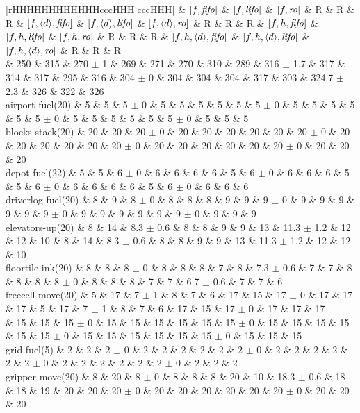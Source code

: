\begin{center}
\begin{tabular}{|rHHHHHHHHHHHHcccHHH|cccHHH|}
 & $[f,{\text{\textit{fifo}}}]$ & $[f,{\text{\textit{lifo}}}]$ & $[f,{\text{\textit{ro}}}]$ & R & R & R & $[f,{\left<d\right>},{\text{\textit{fifo}}}]$ & $[f,{\left<d\right>},{\text{\textit{lifo}}}]$ & $[f,{\left<d\right>},{\text{\textit{ro}}}]$ & R & R & R & $[f,h,{\text{\textit{fifo}}}]$ & $[f,h,{\text{\textit{lifo}}}]$ & $[f,h,{\text{\textit{ro}}}]$ & R & R & R & $[f,h,{\left<d\right>},{\text{\textit{fifo}}}]$ & $[f,h,{\left<d\right>},{\text{\textit{lifo}}}]$ & $[f,h,{\left<d\right>},{\text{\textit{ro}}}]$ & R & R & R\\
\hline
 & 250 & 315 & 270 $\pm$ 1 & 269 & 271 & 270 & 310 & 289 & 316 $\pm$ 1.7 & 317 & 314 & 317 & 295 & 316 & 304 $\pm$ 0 & 304 & 304 & 304 & 317 & 303 & 324.7 $\pm$ 2.3 & 326 & 322 & 326\\
\hline
airport-fuel(20) & 5 & 5 & 5 $\pm$ 0 & 5 & 5 & 5 & 5 & 5 & 5 $\pm$ 0 & 5 & 5 & 5 & 5 & 5 & 5 $\pm$ 0 & 5 & 5 & 5 & 5 & 5 & 5 $\pm$ 0 & 5 & 5 & 5\\
blocks-stack(20) & 20 & 20 & 20 $\pm$ 0 & 20 & 20 & 20 & 20 & 20 & 20 $\pm$ 0 & 20 & 20 & 20 & 20 & 20 & 20 $\pm$ 0 & 20 & 20 & 20 & 20 & 20 & 20 $\pm$ 0 & 20 & 20 & 20\\
depot-fuel(22) & 5 & 5 & 6 $\pm$ 0 & 6 & 6 & 6 & 6 & 5 & 6 $\pm$ 0 & 6 & 6 & 6 & 5 & 5 & 6 $\pm$ 0 & 6 & 6 & 6 & 6 & 5 & 6 $\pm$ 0 & 6 & 6 & 6\\
driverlog-fuel(20) & 8 & 9 & 8 $\pm$ 0 & 8 & 8 & 8 & 9 & 9 & 9 $\pm$ 0 & 9 & 9 & 9 & 9 & 9 & 9 $\pm$ 0 & 9 & 9 & 9 & 9 & 9 & 9 $\pm$ 0 & 9 & 9 & 9\\
elevators-up(20) & 8 & 14 & 8.3 $\pm$ 0.6 & 8 & 8 & 9 & 9 & 13 & 11.3 $\pm$ 1.2 & 12 & 12 & 10 & 8 & 14 & 8.3 $\pm$ 0.6 & 8 & 8 & 9 & 9 & 13 & 11.3 $\pm$ 1.2 & 12 & 12 & 10\\
floortile-ink(20) & 8 & 8 & 8 $\pm$ 0 & 8 & 8 & 8 & 7 & 8 & 7.3 $\pm$ 0.6 & 7 & 7 & 8 & 8 & 8 & 8 $\pm$ 0 & 8 & 8 & 8 & 7 & 7 & 6.7 $\pm$ 0.6 & 7 & 7 & 6\\
freecell-move(20) & 5 & 17 & 7 $\pm$ 1 & 8 & 7 & 6 & 17 & 15 & 17 $\pm$ 0 & 17 & 17 & 17 & 5 & 17 & 7 $\pm$ 1 & 8 & 7 & 6 & 17 & 15 & 17 $\pm$ 0 & 17 & 17 & 17\\
 & 15 & 15 & 15 $\pm$ 0 & 15 & 15 & 15 & 15 & 15 & 15 $\pm$ 0 & 15 & 15 & 15 & 15 & 15 & 15 $\pm$ 0 & 15 & 15 & 15 & 15 & 15 & 15 $\pm$ 0 & 15 & 15 & 15\\
grid-fuel(5) & 2 & 2 & 2 $\pm$ 0 & 2 & 2 & 2 & 2 & 2 & 2 $\pm$ 0 & 2 & 2 & 2 & 2 & 2 & 2 $\pm$ 0 & 2 & 2 & 2 & 2 & 2 & 2 $\pm$ 0 & 2 & 2 & 2\\
gripper-move(20) & 8 & 20 & 8 $\pm$ 0 & 8 & 8 & 8 & 20 & 10 & 18.3 $\pm$ 0.6 & 18 & 18 & 19 & 20 & 20 & 20 $\pm$ 0 & 20 & 20 & 20 & 20 & 20 & 20 $\pm$ 0 & 20 & 20 & 20\\

\end{tabular}
\end{center}
